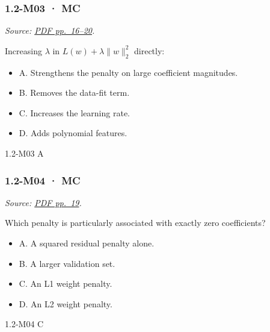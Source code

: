 \noindent\begin{minipage}{\linewidth}

\subsubsection{1.2-M03 · MC}\label{m03-mc-1}

\emph{Source:
\href{../Lecture\%20Slides/1.2.\%20Shallow\%20Learning.pdf\#page=16}{PDF
pp.~16--20}.}

Increasing \(\lambda\) in \(L(w)+\lambda\|w\|_2^2\) directly:

\begin{itemize}
\tightlist
\item
  A. Strengthens the penalty on large coefficient magnitudes.
\item
  B. Removes the data-fit term.
\item
  C. Increases the learning rate.
\item
  D. Adds polynomial features.
\end{itemize}

\begin{solution}[8mm]{1.2-M03}
A
\end{solution}
\end{minipage}\par\medskip

\noindent\begin{minipage}{\linewidth}

\subsubsection{1.2-M04 · MC}\label{m04-mc-1}

\emph{Source:
\href{../Lecture\%20Slides/1.2.\%20Shallow\%20Learning.pdf\#page=19}{PDF
pp.~19}.}

Which penalty is particularly associated with exactly zero coefficients?

\begin{itemize}
\tightlist
\item
  A. A squared residual penalty alone.
\item
  B. A larger validation set.
\item
  C. An L1 weight penalty.
\item
  D. An L2 weight penalty.
\end{itemize}

\begin{solution}[8mm]{1.2-M04}
C
\end{solution}
\end{minipage}\par\medskip

